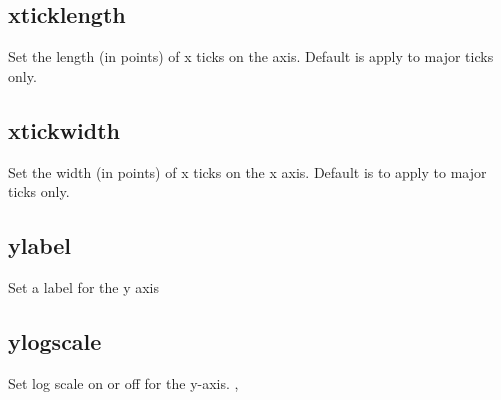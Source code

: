 \documentclass[letterpaper,10pt,english]{sphinxmanual}
\begin{document}
\subsection{xticklength}
\label{\detokenize{plot_control_cmds:xticklength}}
Set the length (in points) of x ticks on the axis. Default is apply to major ticks only.

\begin{sphinxVerbatim}[commandchars=\\\{\}]
\PYG{p}{[}\PYG{p}{]}   \PYG{p}{[}     \PYG{p}{]}
\end{sphinxVerbatim}


\subsection{xtickwidth}
\label{\detokenize{plot_control_cmds:xtickwidth}}
Set the width (in points) of x ticks on the x axis. Default is to apply to major ticks only.

\begin{sphinxVerbatim}[commandchars=\\\{\}]
\PYG{p}{[}\PYG{p}{]}   \PYG{p}{[}     \PYG{p}{]}
\end{sphinxVerbatim}


\subsection{ylabel}
\label{\detokenize{plot_control_cmds:ylabel}}
Set a label for the y axis

\begin{sphinxVerbatim}[commandchars=\\\{\}]
\PYG{p}{[}\PYG{p}{]}  
\end{sphinxVerbatim}


\subsection{ylogscale}
\label{\detokenize{plot_control_cmds:ylogscale}}
Set log scale on or off for the y-axis. , 
\end{document}
